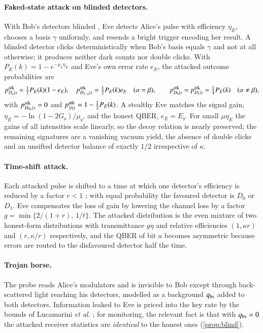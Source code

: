 \paragraph{Faked-state attack on blinded detectors.} With Bob's detectors blinded \cite{Lydersen2010}, Eve detects Alice's pulse with efficiency $\eta_E$, chooses a basis $\gamma$ uniformly, and resends a bright trigger encoding her result. A blinded detector clicks deterministically when Bob's basis equals $\gamma$ and not at all otherwise; it produces neither dark counts nor double clicks. With $P_E(k)=1-e^{-\mu_k\eta_E}$ and Eve's own error rate $e_E$, the attacked outcome probabilities are
\begin{equation}
p^{\rm atk}_{D_a\mid s}=\tfrac12P_E(k)(1-e_E),\quad p^{\rm atk}_{D_{1-a}\mid s}=\tfrac12P_E(k)e_E\quad(\alpha=\beta),\qquad p^{\rm atk}_{D_0\mid s}=p^{\rm atk}_{D_1\mid s}=\tfrac14P_E(k)\quad(\alpha\ne\beta), \label{eq:blind}
\end{equation}
with $p^{\rm atk}_{D_{01}\mid s}=0$ and $p^{\rm atk}_{\varnothing\mid s}=1-\tfrac12P_E(k)$. A stealthy Eve matches the signal gain, $\eta_E=-\ln(1-2G_\mathrm{s})/\mu_\mathrm{s}$, and the honest QBER, $e_E=E_\mathrm{s}$. For small $\mu\eta_E$ the gains of all intensities scale linearly, so the decoy relation is nearly preserved; the remaining signatures are a vanishing vacuum yield, the absence of double clicks and an unsifted detector balance of exactly $1/2$ irrespective of $\kappa$.

\paragraph{Time-shift attack.} Each attacked pulse is shifted to a time at which one detector's efficiency is reduced by a factor $r<1$ \cite{Qi2007,Zhao2008}; with equal probability the favoured detector is $D_0$ or $D_1$. Eve compensates the loss of gain by lowering the channel loss by a factor $g=\min\{2/(1+r),\,1/t\}$. The attacked distribution is the even mixture of two honest-form distributions with transmittance $g\eta$ and relative efficiencies $(1,\kappa r)$ and $(r,\kappa/r)$ respectively, and the QBER of bit $a$ becomes asymmetric because errors are routed to the disfavoured detector half the time.

\paragraph{Trojan horse.} The probe reads Alice's modulators \cite{Gisin2006THA,Lucamarini2015} and is invisible to Bob except through back-scattered light reaching his detectors, modelled as a background $q_{\rm bs}$ added to both detectors. Information leaked to Eve is priced into the key rate by the bounds of Lucamarini \emph{et al.} \cite{Lucamarini2015}; for monitoring, the relevant fact is that with $q_{\rm bs}=0$ the attacked receiver statistics are \emph{identical} to the honest ones (\cref{prop:blind}).

